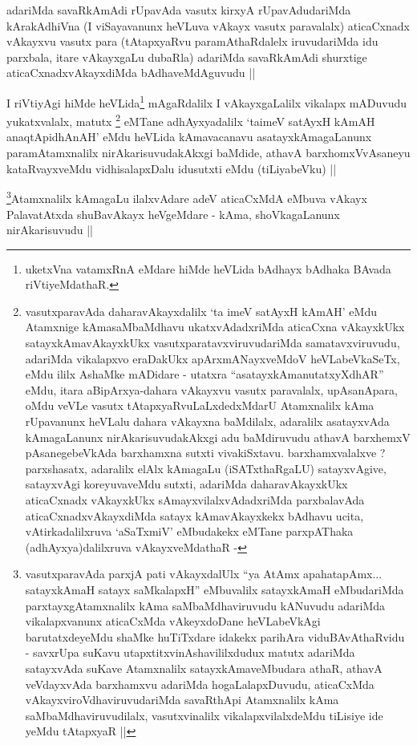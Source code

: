 \begin{artha}
adariMda savaRkAmAdi rUpavAda vasutx kirxyA rUpavAdudariMda
kArakAdhiVna (I viSayavanunx heVLuva vAkayx vasutx paravalalx)
aticaCxnadx vAkayxvu vasutx para (tAtapxyaRvu paramAthaRdalelx
iruvudariMda idu parxbala, itare vAkayxgaLu dubaRla) adariMda
savaRkAmAdi shurxtige aticaCxnadxvAkayxdiMda bAdhaveMdAguvudu ||
\end{artha}


\begin{artha}
I riVtiyAgi hiMde heVLida\footnote{uketxVna vatamxRnA eMdare hiMde
  heVLida bAdhayx bAdhaka BAvada riVtiyeMdathaR.} mAgaRdalilx I vAkayxgaLalilx
vikalapx mADuvudu yukatxvalalx, matutx \footnote{vasutxparavAda
  daharavAkayxdalilx `ta imeV satAyxH kAmAH' eMdu Atamxnige
  kAmasaMbaMdhavu ukatxvAdadxriMda aticaCxna vAkayxkUkx
  satayxkAmavAkayxkUkx vasutxparatavxviruvudariMda samatavxviruvudu,
  adariMda vikalapxvo eraDakUkx apArxmANayxveMdoV heVLabeVkaSeTx, eMdu
  ililx AshaMke mADidare - utatxra ``asatayxkAmanutatxyXdhAR'' eMdu,
  itara aBipArxya-dahara vAkayxvu vasutx paravalalx, upAsanApara, oMdu
  veVLe vasutx tAtapxyaRvuLaLxdedxMdarU Atamxnalilx kAma rUpavanunx
  heVLalu dahara vAkayxna baMdilalx, adaralilx asatayxvAda
  kAmagaLanunx nirAkarisuvudakAkxgi adu baMdiruvudu athavA barxhemxV
  pAsanegebeVkAda barxhamxna sutxti vivakiSxtavu. barxhamxvalalxve ?
  parxshasatx, adaralilx elAlx kAmagaLu (iSATxthaRgaLU) satayxvAgive,
  satayxvAgi koreyuvaveMdu sutxti, adariMda daharavAkayxkUkx
  aticaCxnadx vAkayxkUkx sAmayxvilalxvAdadxriMda parxbalavAda
  aticaCxnadxvAkayxdiMda satayx kAmavAkayxkekx bAdhavu ucita,
  vAtirkadalilxruva `aSaTxmiV' eMbudakekx eMTane parxpAThaka
  (adhAyxya)dalilxruva vAkayxveMdathaR -} eMTane
adhAyxyadalilx `taimeV satAyxH kAmAH anaqtApidhAnAH' eMdu heVLida
kAmavacanavu asatayxkAmagaLanunx paramAtamxnalilx nirAkarisuvudakAkxgi
baMdide, athavA barxhomxVvAsaneyu kataRvayxveMdu vidhisalapxDalu
idusutxti eMdu (tiLiyabeVku) ||
\end{artha}

\begin{artha}
\footnote{vasutxparavAda parxjA pati vAkayxdalUlx ``ya AtAmx
  apahatapAmx... satayxkAmaH satayx saMkalapxH'' eMbuvalilx
  satayxkAmaH eMbudariMda parxtayxgAtamxnalilx kAma saMbaMdhaviruvudu
kANuvudu adariMda vikalapxvanunx aticaCxMda vAkeyxdoDane heVLabeVkAgi
barutatxdeyeMdu shaMke huTiTxdare idakekx parihAra viduBAvAthaRvidu -
savxrUpa suKavu utapxtitxvinAshavililxdudux matutx adariMda satayxvAda
suKave Atamxnalilx satayxkAmaveMbudara athaR, athavA veVdayxvAda
barxhamxvu adariMda hogaLalapxDuvudu, aticaCxMda
vAkayxviroVdhaviruvudariMda savaRthApi Atamxnalilx kAma
saMbaMdhaviruvudilalx, vasutxvinalilx vikalapxvilalxdeMdu tiLisiye ide
yeMdu tAtapxyaR ||}Atamxnalilx kAmagaLu ilalxvAdare adeV aticaCxMdA eMbuva
vAkayx PalavatAtxda shuBavAkayx heVgeMdare - kAma, shoVkagaLanunx
nirAkarisuvudu ||
\end{artha}

